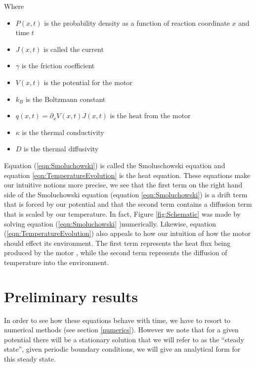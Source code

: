 \documentclass[11pt]{article} %
\begin{document}
Where
\begin{itemize}
\item{$P(x, t)$ is the probability density as a function of  reaction coordinate $x$ and time $t$}
\item{$J(x, t)$ is called the current}
\item{$\gamma$ is the friction coefficient}
\item{$V(x, t)$ is the potential for the motor}
\item{$k_B$ is the Boltzmann constant}
\item{$q(x, t) = \partial_x V(x, t) J(x, t)$ is the heat from the motor}
\item{$\kappa$ is the thermal conductivity}
\item{$D$ is the thermal diffusivity}
\end{itemize}

Equation (\ref{eqn:Smoluchowski}) is called the Smoluschowski equation \cite{KellerBustamante2000} and equation \ref{eqn:TemperatureEvolution} is the heat equation. These equations make our intuitive notions more precise, we see that the first term on the right hand side of the Smoluchowski equation (equation \ref{eqn:Smoluchowski}) is a drift term that is forced by our potential and that the second term contains a diffusion term that is scaled by our temperature. In fact, Figure \ref{fig:Schematic} was made by solving equation (\ref{eqn:Smoluchowski} )numerically. Likewise, equation (\ref{eqn:TemperatureEvolution}) also appeals to how our intuition of how the motor should effect its environment. The first term represents the heat flux being produced by the motor \cite{M.W.Jack2016}, while the second term represents the diffusion of temperature into the environment.


\section{Preliminary results}
 In order to see how these equations behave with time, we have to resort to numerical methods (see section \ref{numerics}). However we note that for a given potential there will be a stationary solution that we will refer to as the ``steady state'', given periodic boundary conditions, we will give an analytical form for this steady state.
\end{document}
